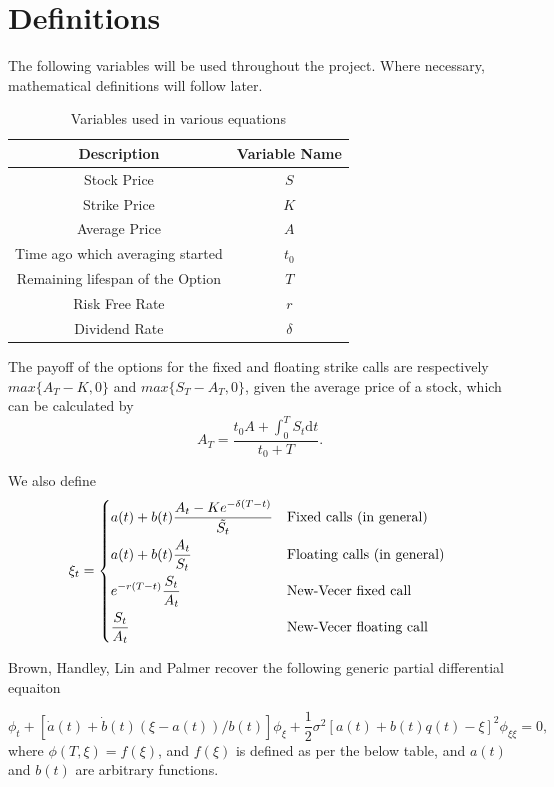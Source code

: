 \documentclass{article}
\begin{document}
\section{Definitions}
The following variables will be used throughout the project. Where necessary, mathematical definitions will follow later.
\begin{table}[H]
  \begin{tabular}{|c|c|}
    \hline
    \textbf{Description} & \textbf{Variable Name} \\ \hline
    Stock Price & \(S\) \\
    Strike Price & \(K\)\\
    Average Price & \(A\) \\
    Time ago which averaging started & \(t_0\) \\
    Remaining lifespan of the Option & \(T\) \\
    Risk Free Rate & \(r\) \\
    Dividend Rate & \(\delta\) \\
    \hline
  \end{tabular}
  \caption{Variables used in various equations}
  \label{table:name}
\end{table}

The payoff of the options for the fixed and floating strike calls are respectively \(max\{A_T - K, 0\}\) and \(max\{S_T - A_T, 0\}\), given the average price of a stock, which can be calculated by
\begin{equation}
  A_T = \frac{t_0A + \int_0^T S_t \mathrm{d}t}{t_0 + T}.
\end{equation}

We also define
\begin{equation}
  \xi_t =
  \begin{dcases*}
    a(t) + b(t) \frac{A_t - Ke^{-\delta(T-t)}}{\tilde{S_t}} & Fixed calls (in general) \\
    a(t) + b(t) \frac{A_t}{S_t} & Floating calls (in general) \\
    e^{-r(T-t)}\frac{S_t}{A_t} & New-Vecer fixed call \\
    \frac{S_t}{A_t} & New-Vecer floating call
  \end{dcases*}
\end{equation}

Brown, Handley, Lin and Palmer\cite{main_paper} recover the following generic partial differential equaiton

\begin{equation}
  \phi_t + [\dot{a}(t) + \dot{b}(t)(\xi - a(t))/b(t)]\phi_\xi + \frac{1}{2}\sigma^2[a(t)+b(t)q(t) - \xi]^2\phi_{\xi\xi} = 0,
\end{equation}
where \(\phi(T, \xi) = f(\xi)\), and \(f(\xi)\) is defined as per the below table, and \(a(t)\) and \(b(t)\) are arbitrary functions.
\end{document}
